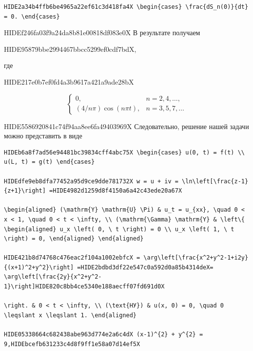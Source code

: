 \documentclass[
  ukrainian,
]{article}
\begin{document}
\begin{verbatim}
HIDE2a34b4ffb6be4965a22ef61c3d418fa4X \begin{cases} \frac{dS_n(0)}{dt} = 0. \end{cases}
\end{verbatim}

HIDEf246fa03f9a24da8b81e00818df083e0X В результате получаем

HIDE95879bbe2994467bbcc5299ef0cdf7bdX,

где

HIDE217e0b7ef0fd4a3b9617a421a9ade28bX

\[
\begin{cases} 0, & n = 2, 4, \dots, \\ (4/n\pi)\cos(n\pi t), & n = 3, 5, 7, \dots \end{cases}
\]

HIDE5586920841c74f94aa8ee6fa49403969X Следовательно, решение нашей
задачи можно представить в виде

\begin{verbatim}
HIDEb6a8f7ad56e94481bc39834cff4abc75X \begin{cases} u(0, t) = f(t) \\ u(L, t) = g(t) \end{cases}

HIDEdfe9eb8dfa77452a95d9ce9dde781732X w = u + iv = \ln\left[\frac{z-1}{z+1}\right] =HIDE4982d1259d8f4150a6a42c43ede20a67X

\begin{aligned} (\mathrm{Y} \mathrm{U} \Pi) & u_t = u_{xx}, \quad 0 < x < 1, \quad 0 < t < \infty, \\ (\mathrm{\Gamma} \mathrm{Y} & \left\{ \begin{aligned} u_x \left( 0, \ t \right) = 0 \\ u_x \left( 1, \ t \right) = 0, \end{aligned} \end{aligned}

HIDE421b8d74768c476eac2f104a1002ebfcX = \arg\left[\frac{x^2+y^2-1+i2y}{(x+1)^2+y^2}\right] =HIDE2bdbd3df22e547c0a592d0a85b4314deX= \arg\left[\frac{2y}{x^2+y^2-1}\right]HIDE820c8bb4ce5340e188aecff07fd691d0X

\right. & 0 < t < \infty, \\ (\text{НУ}) & u(x, 0) = 0, \quad 0 \leqslant x \leqslant 1. \end{aligned}

HIDE05338664c682438abe963d774e2a6c4dX (x-1)^{2} + y^{2} = 9,HIDEbcefb631233c4d8f9ff1e58a07d14ef5X
\end{verbatim}
\end{document}
